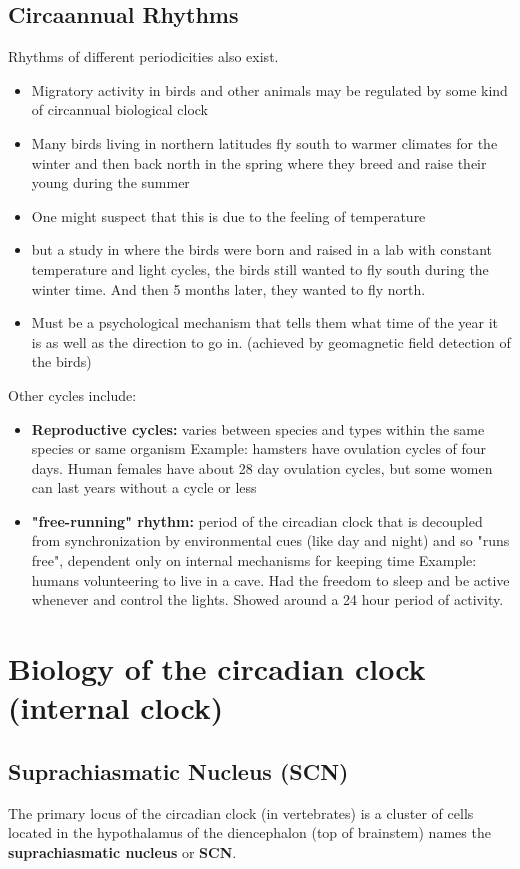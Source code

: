 \documentclass{article}
\begin{document}
\subsection{Circaannual Rhythms}
Rhythms of different periodicities also exist. 
\begin{itemize}
    \item Migratory activity in birds and other animals may be regulated by some kind of circannual biological clock
    \item Many birds living in northern latitudes fly south to warmer climates for the winter and then back north in the spring where they breed and raise their young during the summer
    \item One might suspect that this is due to the feeling of temperature
    \item but a study in where the birds were born and raised in a lab with constant temperature and light cycles, the birds still wanted to fly south during the winter time. And then 5 months later, they wanted to fly north. 
    \item Must be a psychological mechanism that tells them what time of the year it is as well as the direction to go in. (achieved by geomagnetic field detection of the birds)
\end{itemize}

\noindent Other cycles include: 
\begin{itemize}
    \item \textbf{Reproductive cycles:} varies between species and types within the same species or same organism
        \subitem Example: hamsters have ovulation cycles of four days. Human females have about 28 day ovulation cycles, but some women can last years without a cycle or less
    \item \textbf{"free-running" rhythm:} period of the circadian clock that is decoupled from synchronization by environmental cues (like day and night) and so "runs free", dependent only on internal mechanisms for keeping time
        \subitem Example: humans volunteering to live in a cave. Had the freedom to sleep and be active whenever and control the lights. Showed around a 24 hour period of activity. 
\end{itemize}


\newpage
\section{Biology of the circadian clock (internal clock) }
\subsection{Suprachiasmatic Nucleus (SCN)}
The primary locus of the circadian clock (in vertebrates) is a cluster of cells located in the hypothalamus of the diencephalon (top of brainstem) names the \textbf{suprachiasmatic nucleus} or \textbf{SCN}. \\ 
\end{document}
